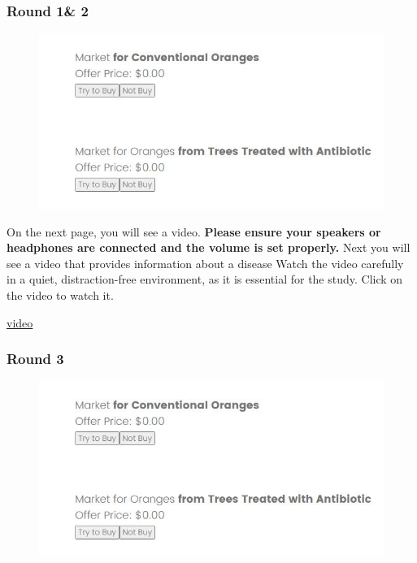 \documentclass[12pt]{article}
\begin{document}
{\clearpage

 \subsubsection*{Round 1\& 2}


 \begin{figure}[H]
    \centering
    \includegraphics[width=0.8\linewidth]{GSO.JPG}
    
    \label{fig:GSO}
\end{figure}

 \vspace{0.5cm}


On the next page, you will see a video. \textbf{Please ensure your speakers or headphones are connected and the volume is set properly.} Next you will see a video that provides information about a disease Watch the video carefully in a quiet, distraction-free environment, as it is essential for the study.
\vspace{0.5cm}
Click on the video to watch it.

\href{https://www.youtube.com/watch?v=_AqMBjB0ChM}{video}
\clearpage


 \subsubsection*{Round 3}



\begin{figure}[H]
    \centering
    \includegraphics[width=\linewidth]{GSO.JPG}
    \caption{}
    \label{fig:Appendix_GSO_game}
\end{figure}
 

}
\end{document}
